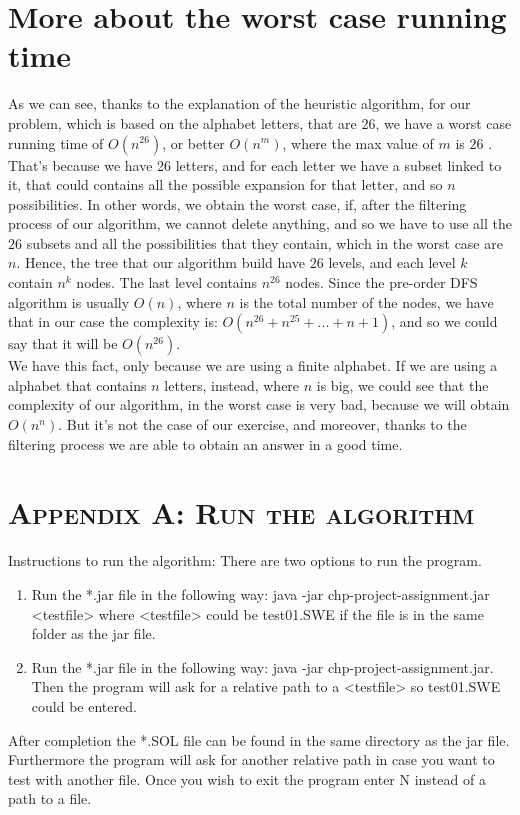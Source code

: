 \documentclass[paper=a4, fontsize=11pt]{scrartcl}
\numberwithin{equation}{section}		%
\numberwithin{figure}{section}			%
\numberwithin{table}{section}				%
\begin{document}
\section{More about the worst case running time}
As we can see, thanks to the explanation of the heuristic algorithm, for our problem, which is based on the alphabet letters, that are 26, we have a worst case running time of $O(n^{26})$, or better $O(n^m)$, where the max value of $m$ is $26$ . That's because we have 26 letters, and for each letter we have a subset linked to it, that could contains all the possible expansion for that letter, and so $n$ possibilities. \newline
In other words, we obtain the worst case, if, after the filtering process of our algorithm, we cannot delete anything, and so we have to use all the $26$ subsets and all the possibilities that they contain, which in the worst case are $n$. Hence, the tree that our algorithm build have $26$ levels, and each level $k$ contain $n^k$ nodes. The last level contains $n^{26}$ nodes. \newline
Since the pre-order DFS algorithm is usually $O(n)$, where $n$ is the total number of the nodes, we have that in our case the complexity is: $O(n^{26} + n^{25} + ... + n + 1)$, and so we could say that it will be $O(n^{26})$. \newline
\\
\noindent We have this fact, only because we are using a finite alphabet. If we are using a alphabet that contains $n$ letters, instead, where $n$ is big, we could see that the complexity of our algorithm, in the worst case is very bad, because we will obtain $O(n^n)$. But it's not the case of our exercise, and moreover, thanks to the filtering process we are able to obtain an answer in a good time.

\section{\textsc{Appendix A: Run the algorithm}}
Instructions to run the algorithm:
There are two options to run the program.
\begin{enumerate}
	\item
	Run the *.jar file in the following way: java -jar chp-project-assignment.jar <testfile> where <testfile> could be test01.SWE if the file is in the same folder as the jar file.
	\item
	Run the *.jar file in the following way: java -jar chp-project-assignment.jar. Then the program will ask for a relative path to a <testfile> so test01.SWE could be entered.
\end{enumerate}
After completion the *.SOL file can be found in the same directory as the jar file. Furthermore the program will ask for another relative path in case you want to test with another file. Once you wish to exit the program enter N instead of a path to a file.

\end{document}
